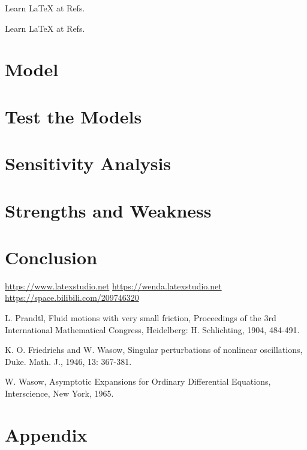 \documentclass{swmcmthesis}
\begin{document}
Learn \LaTeX{} at Refs.\cite{bib:one,bib:two}

Learn \LaTeX{} at Refs.\cite{bib:one,bib:two,vedio,bib4}

\section{Model}
\lipsum[1-2]

\section{Test the Models}
\lipsum[1-2]

\section{Sensitivity Analysis}
\lipsum[1-2]

\section{Strengths and Weakness}
\lipsum[1-2]

\section{Conclusion}
\lipsum[1-2]


\begin{thebibliography}{9}%
 \url{https://www.latexstudio.net}
 \url{https://wenda.latexstudio.net}
 \url{https://space.bilibili.com/209746320}

 L. Prandtl, Fluid motions with very small friction, Proceedings of the 3rd International Mathematical Congress, Heidelberg: H. Schlichting, 1904, 484-491.

 K. O. Friedriehs and W. Wasow, Singular perturbations of nonlinear oscillations, Duke. Math. J., 1946, 13: 367-381.

 W. Wasow, Asymptotic Expansions for Ordinary Differential Equations, Interscience, New York, 1965.
\end{thebibliography}


\newpage

\section*{Appendix}
\end{document}
